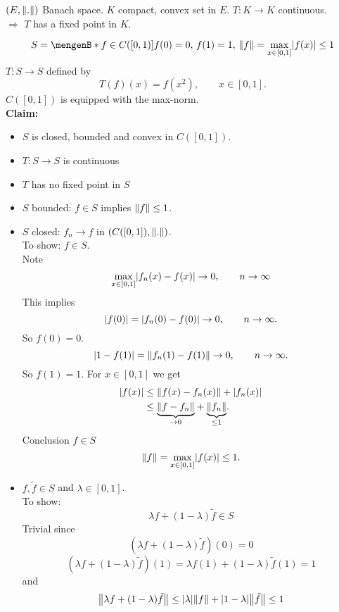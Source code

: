 \begin{theorem}
	$(E, \norm{.})$ Banach space. $K$ compact, convex set in $E$. $T: K \to K$ continuous. \\
	$\Rightarrow $ $T$ has a fixed point in $K$.
\end{theorem}
\begin{beispiel}
	\[
		S = \set[f \in C([0,1])]{f(0) = 0,\, f(1)=1,\, \norm{f} = \max\limits_{x \in [0,1]} \abs{f(x)} \leq 1}
	\]
	$T: S \to S$ defined by
	\[
		T(f)(x) = f(x^2), \qquad x \in [0,1].
	\]
	$C([0,1])$ is equipped with the max-norm. \\
	\textbf{Claim:} \text{    }     \begin{itemize}
		\item $S$ is closed, bounded and convex in $C([0,1])$.
		\item $T: S \to S$ is continuous
		\item $T$ has no fixed point in $S$
	\end{itemize}
	\begin{itemize}
		\item 
	$S$ bounded: $f \in S$ implies $\norm{f}\leq 1$. 
	\item $S$ closed: $f_n \to f$ in $(C([0,1]),\norm{.})$. \\
	To show: $f \in S$. \\
	Note \[
		\max_{x \in [0,1]}\lvert f_n(x)-f(x)\rvert \to 0, \qquad n \to \infty
	\]
	This implies
	\[
		\lvert f(0)\rvert = \lvert f_n(0)-f(0)\rvert \to 0, \qquad n \to \infty.
	\]
	So $f(0)=0$.
	\[
		\abs{1-f(1)} = \norm{f_n(1)-f(1)} \to 0, \qquad n \to \infty.
	\]
	So $f(1)=1$. For $x \in [0,1]$ we get
	\begin{align*}
		\abs{f(x)} &\leq \norm{f(x)-f_n(x)} + \abs{f_n(x)} \\
		&\leq \underset{\to 0}{\underbrace{\norm{f-f_n}}} + \underset{\leq 1}{\underbrace{\norm{f_n}}}. 
	\end{align*}
	Conclusion $f \in S$
	\[
		\norm{f} = \max_{x \in [0,1]}\abs{f(x)} \leq 1.
	\]
	\item $f,\tilde f \in S$ and $\lambda \in [0,1]$. \\
	To show: 
	\[
		\lambda f + (1- \lambda) \tilde f \in S
	\]
	Trivial since
	\[
		(\lambda f + (1-\lambda) \tilde f)(0) = 0 
	\]
	\[
		(\lambda f + (1- \lambda) \tilde f)(1) = \lambda f(1)+ (1- \lambda)\tilde f(1)= 1
	\]
	and	
	\[
		\norm{\lambda f + (1-\lambda) \tilde f} \leq \abs{\lambda} \norm{f} + \abs{1- \lambda} \norm{ \tilde f} \leq 1
	\]
	\end{itemize}

\end{beispiel}
